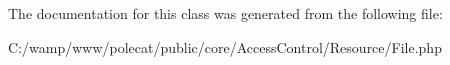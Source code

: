 The documentation for this class was generated from the following file\+:\begin{DoxyCompactItemize}
\item 
C\+:/wamp/www/polecat/public/core/\+Access\+Control/\+Resource/File.\+php\end{DoxyCompactItemize}
